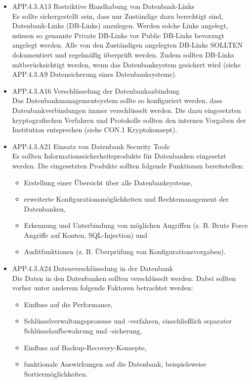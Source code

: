 \begin{itemize}
			\item  APP.4.3.A13 Restriktive Handhabung von Datenbank-Links \\
			Es sollte sichergestellt sein, dass nur Zust\"andige dazu berechtigt sind, Datenbank-Links (DB-Links) anzulegen. Werden solche Links angelegt, m\"ussen so genannte Private DB-Links vor Public DB-Links bevorzugt angelegt werden. Alle von den Zust\"andigen angelegten DB-Links SOLLTEN dokumentiert und regelm\"a{\ss}ig \"uberpr\"uft werden. Zudem sollten DB-Links mitber\"ucksichtigt werden, wenn das Datenbanksystem gesichert wird (siehe APP.4.3.A9 Datensicherung eines Datenbanksystems).\\

			\item APP.4.3.A16 Verschl\"usselung der Datenbankanbindung \\
			Das Datenbankmanagementsystem sollte so konfiguriert werden, dass Datenbankverbindungen immer verschl\"usselt werden. Die dazu eingesetzten kryptografischen Verfahren und Protokolle sollten den internen Vorgaben der Institution entsprechen (siehe CON.1 Kryptokonzept).\\
			
			\item APP.4.3.A21 Einsatz von Datenbank Security Tools\\
			Es sollten Informationssicherheitsprodukte f\"ur Datenbanken eingesetzt werden. Die eingesetzten Produkte sollten folgende Funktionen bereitstellen:
\begin{itemize}
	\item Erstellung einer \"Ubersicht \"uber alle Datenbanksysteme,
	\item erweiterte Konfigurationsm\"oglichkeiten und Rechtemanagement der Datenbanken,
	\item Erkennung und Unterbindung von m\"oglichen Angriffen (z. B. Brute Force Angriffe auf Konten, SQL-Injection) und
	\item Auditfunktionen (z. B. \"Uberpr\"ufung von Konfigurationsvorgaben).\\
\end{itemize}
			
			\item APP.4.3.A24 Datenverschl\"usselung in der Datenbank\\
			Die Daten in den Datenbanken sollten verschl\"usselt werden. Dabei sollten vorher unter anderem folgende Faktoren betrachtet werden:
\begin{itemize}
	\item Einfluss auf die Performance,
	\item Schl\"usselverwaltungsprozesse und -verfahren, einschlie{\ss}lich separater Schl\"usselaufbewahrung und -sicherung,
	\item Einfluss auf Backup-Recovery-Konzepte,
	\item funktionale Auswirkungen auf die Datenbank, beispielsweise Sortierm\"oglichkeiten.\\
\end{itemize}
\end{itemize}

